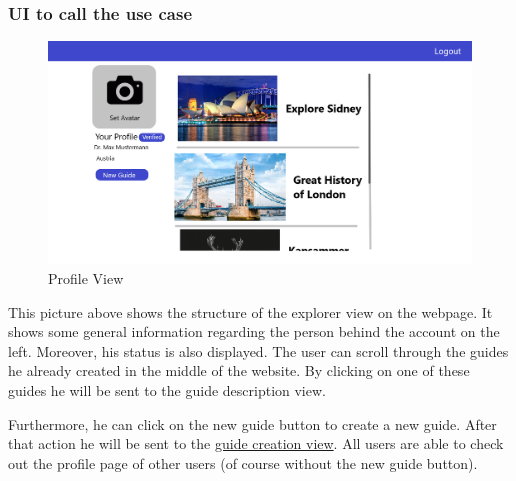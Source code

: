 \documentclass[12pt]{article}
\theoremstyle{definition}
\newenvironment{text}{
   \setlength{\parindent}{0pt}
   \color{black}
}{}
\begin{document}
    \subsubsection{UI to call the use case}
    \begin{figure}[hbt!]
        \centering
        \includegraphics[width=1\linewidth]{UIs/ProfileWeb.png}
        \caption{Profile View}
        \label{fig:profile_view}
    \end{figure}
    \begin{text}
    This picture above shows the structure of the explorer view on the webpage. It shows some general information regarding the person behind the account on the left. Moreover, his status is also displayed. The user can scroll through the guides he already created in the middle of the website. By clicking on one of these guides he will be sent to the guide description view.
    
    Furthermore, he can click on the new guide button to create a new guide. After that action he will be sent to the \hyperref[fig:create_guide]{guide creation view}. All users are able to check out the profile page of other users (of course without the new guide button).
    \end{text}
\end{document}
